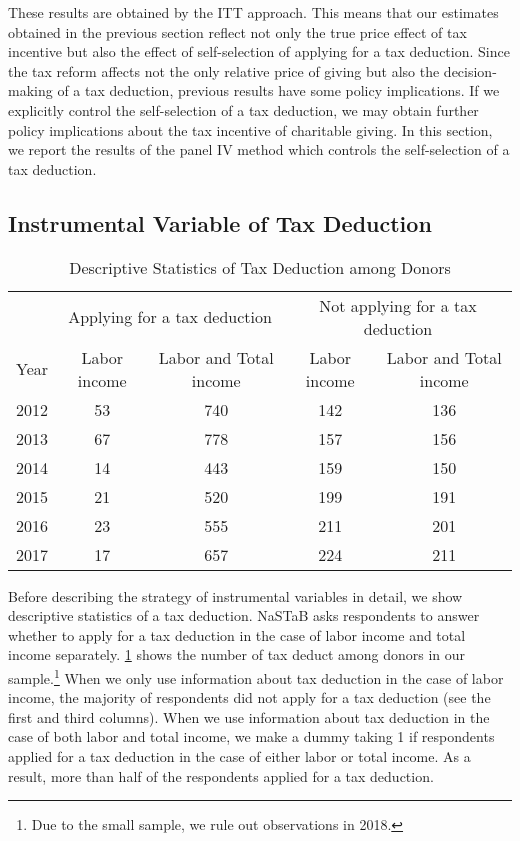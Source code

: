 \documentclass[
  11pt,
  a4paper,
]{article}
\begin{document}
These results are obtained by the ITT approach.
This means that our estimates obtained in the previous section reflect not only
the true price effect of tax incentive but also the effect of self-selection of applying for a tax deduction.
Since the tax reform affects not the only relative price of giving but also the decision-making of a tax deduction,
previous results have some policy implications.
If we explicitly control the self-selection of a tax deduction,
we may obtain further policy implications about the tax incentive of charitable giving.
In this section, we report the results of the panel IV method which controls the self-selection of a tax deduction.

\hypertarget{instrumental-variable-of-tax-deduction}{%
\subsection{Instrumental Variable of Tax Deduction}\label{instrumental-variable-of-tax-deduction}}

\begin{table}

\caption{\label{tab:SummaryDeduct}Descriptive Statistics of Tax Deduction among Donors}
\centering
\begin{tabular}[t]{lcccc}
\toprule
\multicolumn{1}{c}{} & \multicolumn{2}{c}{Applying for a tax deduction} & \multicolumn{2}{c}{Not applying for a tax deduction} \\
\cmidrule(l{3pt}r{3pt}){2-3} \cmidrule(l{3pt}r{3pt}){4-5}
Year & Labor income & Labor and Total income & Labor income & Labor and Total income\\
\midrule
2012 & 53 & 740 & 142 & 136\\
2013 & 67 & 778 & 157 & 156\\
2014 & 14 & 443 & 159 & 150\\
2015 & 21 & 520 & 199 & 191\\
2016 & 23 & 555 & 211 & 201\\
2017 & 17 & 657 & 224 & 211\\
\bottomrule
\end{tabular}
\end{table}

Before describing the strategy of instrumental variables in detail,
we show descriptive statistics of a tax deduction.
NaSTaB asks respondents to answer whether to apply for a tax deduction
in the case of labor income and total income separately.
\ref{tab:SummaryDeduct} shows the number of tax deduct among donors in our sample.\footnote{Due to the small sample, we rule out observations in 2018.}
When we only use information about tax deduction in the case of labor income,
the majority of respondents did not apply for a tax deduction (see the first and third columns).
When we use information about tax deduction in the case of both labor and total income,
we make a dummy taking 1 if respondents applied for a tax deduction in the case of
either labor or total income.
As a result, more than half of the respondents applied for a tax deduction.
\end{document}
